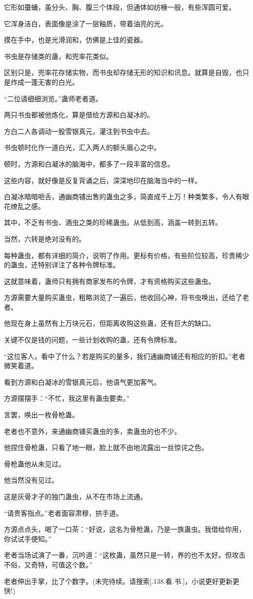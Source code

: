 \begin{this_body}
它形如蚕蛹，虽分头、胸、腹三个体段，但通体如纺棰一般，有些浑圆可爱。

它浑身洁白，表面像是涂了一层釉质，带着油亮的光。

摸在手中，也是光滑润和，仿佛是上佳的瓷器。

书虫是存储类的蛊，和兜率花类似。

区别只是，兜率花存储实物，而书虫却存储无形的知识和讯息。就算是自毁，也只是炸成一蓬无害的白光。

“二位请细细浏览。”蛊师老者道。

两只书虫都被他炼化，算是借给方源和白凝冰的。

方白二人各调动一股雪银真元，灌注到书虫中去。

书虫顿时化作一道白光，汇入两人的额头眉心之中。

顿时，方源和白凝冰的脑海中，都多了一段丰富的信息。

这些内容，就好像是反复背诵之后，深深地印在脑海当中的一样。

白凝冰暗暗咂舌，通幽商铺出售的蛊虫之多，简直成千上万！种类繁多，令人有眼花缭乱之感。

其中，不乏有书虫、酒虫之类的珍稀蛊虫。从低到高，涵盖一转到五转。

当然，六转是绝对没有的。

每种蛊虫，都有详细的简介，说明了作用。更标有价格，有些阶位较高，珍贵稀少的蛊虫，还特别详注了各种令牌标准。

这就意味着，蛊师只有拥有商家发布的令牌，才有资格购买这些蛊虫。

方源需要大量购买蛊虫，粗略浏览了一遍后，他收回心神，将书虫唤出，还给了老者。

他现在身上虽然有上万块元石，但距离收购这些蛊，还有巨大的缺口。

关键不仅是钱的问题，一些计划收购的蛊，还有令牌标准。

“这位客人，看中了什么？若是购买的量多，我们通幽商铺还有相应的折扣。”老者微笑着道。

看到方源和白凝冰的雪银真元后，他语气更加客气。

方源摆摆手：“不忙，我这里有蛊虫要卖。”

言罢，唤出一枚骨枪蛊。

老者也不意外，来通幽商铺买蛊虫的多，卖蛊虫的也不少。

他捏住骨枪蛊，只看了地一眼，脸上就不由地流露出一丝惊诧之色。

骨枪蛊他从未见过。

他当然没有见过。

这是灰骨才子的独门蛊虫，从不在市场上流通。

“请贵客指点。”老者面容肃穆，拱手道。

方源点点头，喝了一口茶：“好说，这名为骨枪蛊，乃是一族蛊虫。我借给你用，你试试手便知。”

老者当场试演了一番，沉吟道：“这枚蛊，虽然只是一转，养的也不太好。但攻击不俗，又奇特，可值这个数。”

老者伸出手掌，比了个数字。(未完待续。请搜索[.138.看.书.]，小说更好更新更快!)

\end{this_body}

